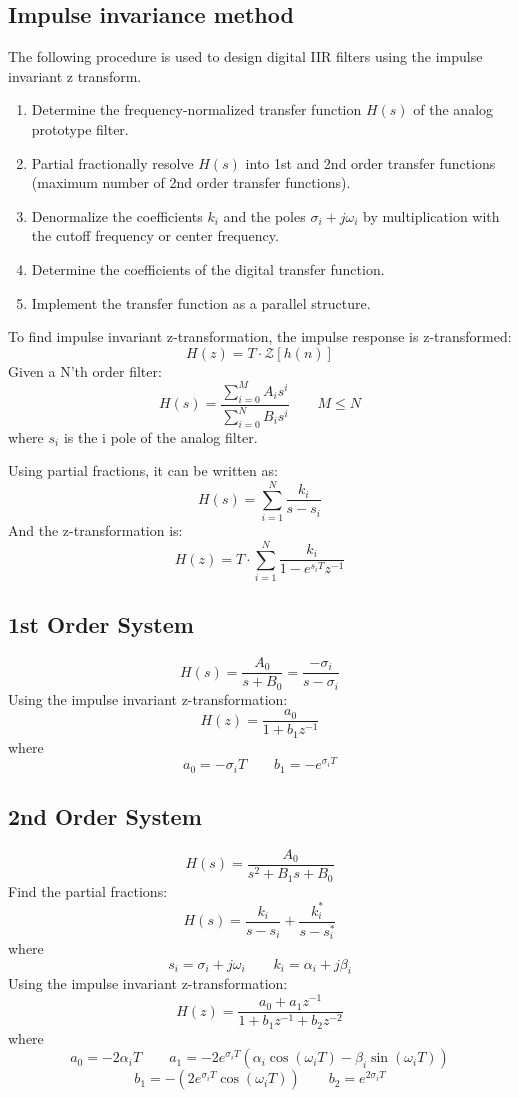 \subsection{Impulse invariance method}
The following procedure is used to design digital IIR filters using the impulse invariant z transform.
\begin{enumerate}
  \item Determine the frequency-normalized transfer function $H(s)$ of the analog prototype filter.
  \item Partial fractionally resolve $H(s)$ into 1st and 2nd order transfer functions (maximum number of 2nd order transfer functions).
  \item Denormalize the coefficients $k_i$ and the poles $\sigma_i+j\omega_i$ by multiplication with the cutoff frequency or center frequency.
  \item Determine the coefficients of the digital transfer function.
  \item Implement the transfer function as a parallel structure.
\end{enumerate}

To find impulse invariant z-transformation, the impulse response is z-transformed:
$$H(z)=T\cdot \mathcal{Z}[h(n)]$$
Given a N'th order filter:
$$H(s)=\frac{\sum_{i=0}^M A_is^i}{\sum_{i=0}^N B_is^i}\qquad M\leq N$$
where $s_i$ is the i pole of the analog filter.

Using partial fractions, it can be written as:
$$H(s)=\sum_{i=1}^N \frac{k_i}{s-s_i}$$
And the z-transformation is:
$$H(z)=T\cdot \sum_{i=1}^N \frac{k_i}{1-e^{s_i T}z^{-1}}$$

\subsection{1st Order System}
$$H(s)=\frac{A_0}{s+B_0}=\frac{-\sigma_i}{s-\sigma_i}$$
Using the impulse invariant z-transformation:
$$H(z)=\frac{a_0}{1+b_1z^{-1}}$$
where
$$a_0=-\sigma_i T \qquad b_1=-e^{\sigma_iT}$$
\subsection{2nd Order System}
$$H(s)=\frac{A_0}{s^2+B_1s+B_0}$$
Find the partial fractions:
$$H(s)=\frac{k_i}{s-s_i}+\frac{k_i^*}{s-s_i^*}$$
where
$$s_i=\sigma_i+j\omega_i\qquad k_i=\alpha_i+j\beta_i$$
Using the impulse invariant z-transformation:
$$H(z)=\frac{a_0+a_1z^{-1}}{1+b_1z^{-1}+b_2z^{-2}}$$
where
$$a_0=-2\alpha_i T \qquad a_1=-2e^{\sigma_iT}(\alpha_i\cos(\omega_iT)-\beta_i\sin(\omega_iT))$$
$$b_1=-(2e^{\sigma_iT}\cos(\omega_iT)) \qquad b_2=e^{2\sigma_iT}$$

